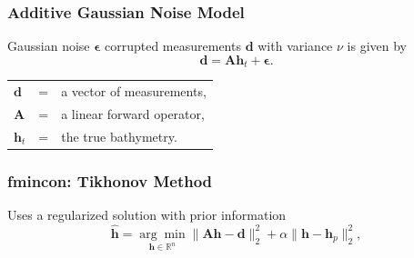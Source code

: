 \documentclass[7pt]{beamer}
\begin{document}

 \begin{frame}
\frametitle{Additive Gaussian Noise Model}

Gaussian noise $\boldsymbol{\epsilon}$ corrupted measurements $\mathbf{d}$ with variance $\nu$ is given by 
$$
\mathbf{d} = \mathbf{A} \mathbf{h}_t + \boldsymbol{\epsilon}.
$$

\begin{tabular}{l c l}
$\mathbf{d}$ &=& a vector of measurements,\\
$\mathbf{A}$ &=& a linear forward operator,\\
$\mathbf{h}_t$ &=& the true bathymetry. 
\end{tabular}

\end{frame}


 \begin{frame}
\frametitle{fmincon: Tikhonov Method}
\centering
Uses a regularized solution with prior information
$$
\mathbf{\hat{h}} = \underset{\mathbf{h} \in \mathbb{R}^n}{\arg \min} \|  \mathbf{A}\mathbf{h} -  \mathbf{d} \|_2^2  +  \alpha \| \mathbf{h} -  \mathbf{h}_p\|_2^2,
$$
\end{frame}

\end{document}
